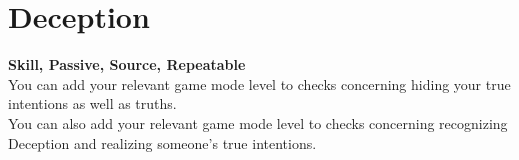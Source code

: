 \section{Deception}\label{sec:deception}
\textbf{Skill, Passive, Source, Repeatable}\\
You can add your relevant game mode level to checks concerning hiding your true intentions as well as truths.\\
You can also add your relevant game mode level to checks concerning recognizing Deception and realizing someone's true intentions.
